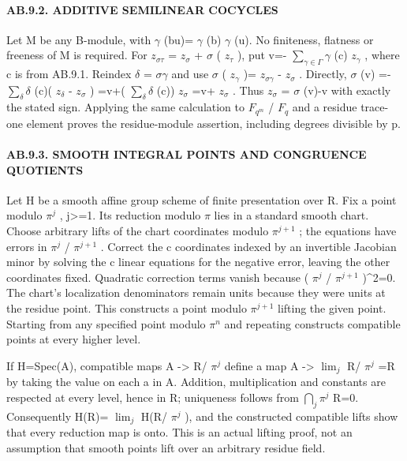 \documentclass[
  11pt,
]{article}
\begin{document}
\paragraph{AB.9.2. ADDITIVE SEMILINEAR
COCYCLES}\label{ab.9.2.-additive-semilinear-cocycles}

Let M be any B-module, with \(\gamma\) (bu)= \(\gamma\) (b) \(\gamma\)
(u). No finiteness, flatness or freeness of M is required. For
\(z_{\sigma \tau}\) = \(z_{\sigma}\) + \(\sigma\) ( \(z_{\tau}\) ), put
v=- \(\sum_{\gamma\in \Gamma} \gamma\) (c) \(z_{\gamma}\) , where c is
from AB.9.1. Reindex \(\delta\) = \(\sigma \gamma\) and use \(\sigma\) (
\(z_{\gamma}\) )= \(z_{\sigma \gamma}\) - \(z_{\sigma}\) . Directly,
\(\sigma\) (v) =- \(\sum_{\delta} \delta\) (c)( \(z_{\delta}\) -
\(z_{\sigma}\) ) =v+( \(\sum_{\delta} \delta\) (c)) \(z_{\sigma}\) =v+
\(z_{\sigma}\) . Thus \(z_{\sigma}\) = \(\sigma\) (v)-v with exactly the
stated sign. Applying the same calculation to \(F_{q^m}\) / \(F_{q}\)
and a residue trace-one element proves the residue-module assertion,
including degrees divisible by p.

\paragraph{AB.9.3. SMOOTH INTEGRAL POINTS AND CONGRUENCE
QUOTIENTS}\label{ab.9.3.-smooth-integral-points-and-congruence-quotients}

Let H be a smooth affine group scheme of finite presentation over R. Fix
a point modulo \(\pi^j\) , j\textgreater=1. Its reduction modulo \(\pi\)
lies in a standard smooth chart. Choose arbitrary lifts of the chart
coordinates modulo \(\pi^{j+1}\) ; the equations have errors in
\(\pi^j\) / \(\pi^{j+1}\) . Correct the c coordinates indexed by an
invertible Jacobian minor by solving the c linear equations for the
negative error, leaving the other coordinates fixed. Quadratic
correction terms vanish because ( \(\pi^j\) / \(\pi^{j+1}\) )\^{}2=0.
The chart's localization denominators remain units because they were
units at the residue point. This constructs a point modulo \(\pi^{j+1}\)
lifting the given point. Starting from any specified point modulo
\(\pi^n\) and repeating constructs compatible points at every higher
level.

If H=Spec(A), compatible maps A -\textgreater{} R/ \(\pi^j\) define a
map A -\textgreater{} \(\lim_{j}\) R/ \(\pi^j\) =R by taking the value
on each a in A. Addition, multiplication and constants are respected at
every level, hence in R; uniqueness follows from \(\bigcap_{j} \pi^j\)
R=0. Consequently H(R)= \(\lim_{j}\) H(R/ \(\pi^j\) ), and the
constructed compatible lifts show that every reduction map is onto. This
is an actual lifting proof, not an assumption that smooth points lift
over an arbitrary residue field.
\end{document}
